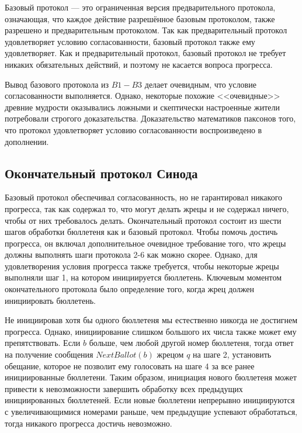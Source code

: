 \documentclass[12pt, a4paper]{article} %
\begin{document}
Базовый протокол --- это ограниченная версия предварительного протокола, означающая, что каждое действие разрешённое базовым протоколом, также разрешено и предварительным протоколом. Так как предварительный протокол удовлетворяет условию согласованности, базовый протокол также ему удовлетворяет. Как и предварительный протокол, базовый протокол не требует никаких обязательных действий, и поэтому не касается вопроса прогресса.

Вывод базового протокола из $B1 - B3$ делает очевидным, что условие согласованности выполняется. Однако, некоторые похожие <<очевидные>> древние мудрости оказывались ложными и скептически настроенные жители потребовали строгого доказательства. Доказательство математиков паксонов того, что протокол удовлетворяет условию согласованности воспроизведено в дополнении.

\subsection{Окончательный протокол Синода}

Базовый протокол обеспечивал согласованность, но не гарантировал никакого прогресса, так как содержал то, что могут делать жрецы и не содержал ничего, чтобы от них требовалось делать. Окончательный протокол состоит из шести шагов обработки бюллетеня как и базовый протокол. Чтобы помочь достичь прогресса, он включал дополнительное очевидное требование того, что жрецы должны выполнять шаги протокола 2-6 как можно скорее. Однако, для удовлетворения условия прогресса также требуется, чтобы некоторые жрецы выполняли шаг 1, на котором инициируется бюллетень. Ключевым  моментом окончательного протокола было определение того, когда жрец должен инициировать бюллетень.

Не инициировав хотя бы одного бюллетеня мы естественно никогда не достигнем прогресса. Однако, инициирование слишком большого их числа также может ему препятствовать. Если $b$ больше, чем любой другой номер бюллетеня, тогда ответ на получение сообщения $NextBallot(b)$  жрецом $q$ на шаге 2, установить обещание, которое не позволит ему голосовать на шаге 4 за все ранее инициированные бюллетени. Таким образом, инициация нового бюллетеня может привести к невозможности завершить обработку всех предыдущих инициированных бюллетеней. Если новые бюллетени непрерывно инициируются с увеличивающимися номерами раньше, чем предыдущие успевают обработаться, тогда никакого прогресса достичь невозможно.
\end{document}

